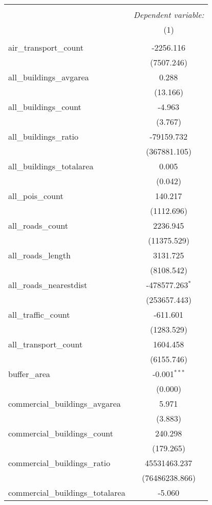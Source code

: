 \begin{table}[!htbp] \centering
\begin{tabular}{@{\extracolsep{5pt}}lc}
\\[-1.8ex]\hline
\hline \\[-1.8ex]
& \multicolumn{1}{c}{\textit{Dependent variable:}} \
\cr \cline{1-2}
\\[-1.8ex] & (1) \\
\hline \\[-1.8ex]
 air_transport_count & -2256.116$^{}$ \\
  & (7507.246) \\
 all_buildings_avgarea & 0.288$^{}$ \\
  & (13.166) \\
 all_buildings_count & -4.963$^{}$ \\
  & (3.767) \\
 all_buildings_ratio & -79159.732$^{}$ \\
  & (367881.105) \\
 all_buildings_totalarea & 0.005$^{}$ \\
  & (0.042) \\
 all_pois_count & 140.217$^{}$ \\
  & (1112.696) \\
 all_roads_count & 2236.945$^{}$ \\
  & (11375.529) \\
 all_roads_length & 3131.725$^{}$ \\
  & (8108.542) \\
 all_roads_nearestdist & -478577.263$^{*}$ \\
  & (253657.443) \\
 all_traffic_count & -611.601$^{}$ \\
  & (1283.529) \\
 all_transport_count & 1604.458$^{}$ \\
  & (6155.746) \\
 buffer_area & -0.001$^{***}$ \\
  & (0.000) \\
 commercial_buildings_avgarea & 5.971$^{}$ \\
  & (3.883) \\
 commercial_buildings_count & 240.298$^{}$ \\
  & (179.265) \\
 commercial_buildings_ratio & 45531463.237$^{}$ \\
  & (76486238.866) \\
 commercial_buildings_totalarea & -5.060$^{}$ \\

\end{tabular}
\end{table}
